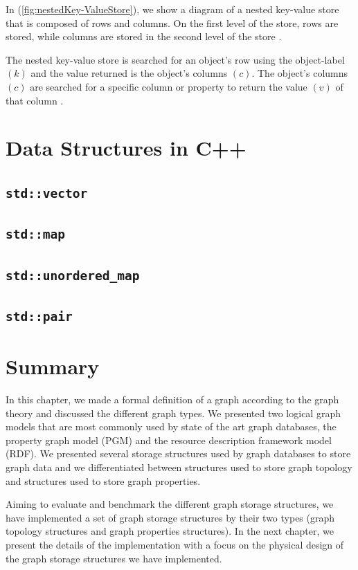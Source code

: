 {In (\ref{fig:nestedKey-ValueStore}), we show a diagram of a nested key-value store that is composed of rows and columns. On the first level of the store, rows are stored, while columns are stored in the second level of the store \cite{ladwig2011cumulusrdf}.

The nested key-value store is searched for an object's row using the object-label $(k)$ and the value returned is the object's columns $(c)$. The object's columns $(c)$ are searched for a specific column or property to return the value $(v)$ of that column \cite{ladwig2011cumulusrdf}.




\section{Data Structures in C++}
\label{sec:DataStructuresInC++}

\subsection{\texttt{std::vector}}
\subsection{\texttt{std::map}}
\subsection{\texttt{std::unordered\_map}}
\subsection{\texttt{std::pair}}

\section{Summary}
\label{sec:BackgroundSummary}

In this chapter, we made a formal definition of a graph according to the graph theory and discussed the different graph types. We presented two logical graph models that are most commonly used  by state of the art graph databases, the property graph model (PGM) and the resource description framework model (RDF). We presented several storage structures used by graph databases to store graph data and we differentiated between structures used to store graph topology and structures used to store graph properties.

Aiming to evaluate and benchmark the different graph storage structures, we have implemented a set of graph storage structures by their two types (graph topology structures and graph properties structures). In the next chapter, we present the details of the implementation with a focus on the physical design of the graph storage structures we have implemented.

}
